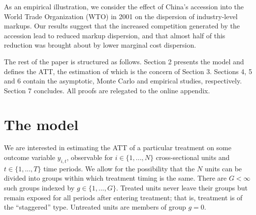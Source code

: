 \documentclass[12pt,fleqn]{article}
\begin{document}
  As an empirical illustration, we consider the effect of China's accession into the World Trade Organization (WTO) in 2001 on the dispersion of industry-level markups. Our results suggest that the increased competition generated by the accession lead to reduced markup dispersion, and that almost half of this reduction was brought about by lower marginal cost dispersion.
  
  The rest of the paper is structured as follows. Section 2 presents the model and defines the ATT, the estimation of which is the concern of Section 3. Sections 4, 5 and 6 contain the asymptotic, Monte Carlo and empirical studies, respectively. Section 7 concludes. All proofs are relegated to the online appendix.
  
  \section{The model}
  
  We are interested in estimating the ATT of a particular treatment on some outcome variable $y_{i,t}$, observable for $i\in \{1,...,N\}$ cross-sectional units and $t\in\{1,...,T\}$ time periods. We allow for the possibility that the $N$ units can be divided into groups within which treatment timing is the same. There are $G < \infty$ such groups indexed by $g \in \{1,...,G\}$. Treated units never leave their groups but remain exposed for all periods after entering treatment; that is, treatment is of the ``staggered'' type. Untreated units are members of group $g=0$.
  
\end{document}
